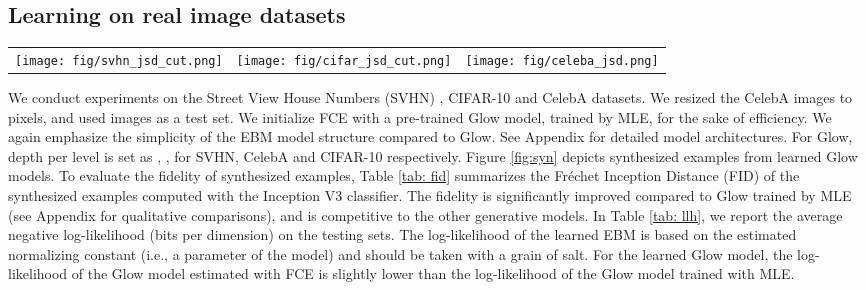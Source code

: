 \documentclass[10pt,twocolumn,letterpaper]{article}
\begin{document}
\subsection{Learning on real image datasets}
\begin{figure*}
\begin{center}
\setlength{\tabcolsep}{8pt}
\begin{tabular}{ccc}
  \texttt{[image: fig/svhn\_jsd\_cut.png]}   & \texttt{[image: fig/cifar\_jsd\_cut.png]} & 
  \texttt{[image: fig/celeba\_jsd.png]}
\end{tabular}
\caption{Synthesized examples from the Glow model learned by FCE. From left to right panels are from SVHN, CIFAR-10 and CelebA datasets, respectively. The image size is .}
\label{fig:syn}
\end{center}
\end{figure*}
We conduct experiments on the Street View House Numbers (SVHN) \cite{netzer2011reading}, CIFAR-10 \cite{krizhevsky2009learning} and CelebA \cite{liu2015faceattributes} datasets. We resized the CelebA images to  pixels, and used  images as a test set. We initialize FCE with a pre-trained Glow model, trained by MLE, for the sake of efficiency. We again emphasize the simplicity of the EBM model structure compared to Glow. See Appendix for detailed model architectures. For Glow, depth per level \cite{kingma2018Glow} is set as , ,  for SVHN, CelebA and CIFAR-10 respectively. Figure \ref{fig:syn} depicts synthesized examples from learned Glow models. To evaluate the fidelity of synthesized examples, Table \ref{tab: fid} summarizes the Fr\'echet Inception Distance (FID) \cite{heusel2017gans} of the synthesized examples computed with the Inception V3 \cite{szegedy2016rethinking} classifier. The fidelity is significantly improved compared to Glow trained by MLE (see Appendix for qualitative comparisons), and is competitive to the other generative models. In Table \ref{tab: llh}, we report the average negative log-likelihood (bits per dimension) on the testing sets. The log-likelihood of the learned EBM is based on the estimated normalizing constant (i.e., a parameter of the model) and should be taken with a grain of salt. 
For the learned Glow model, the log-likelihood of the Glow model estimated with FCE is slightly lower than the log-likelihood of the Glow model trained with MLE. 
\end{document}
